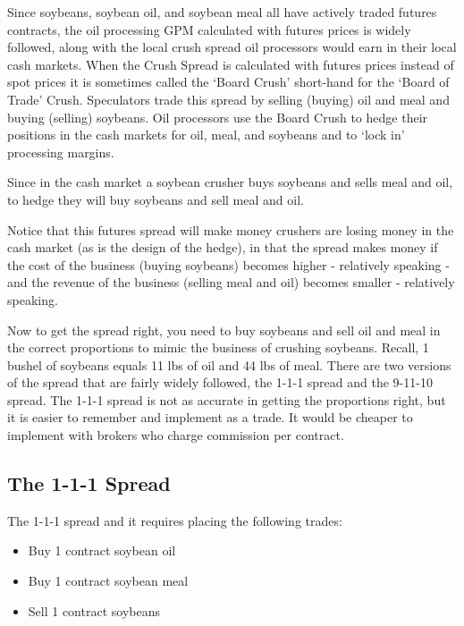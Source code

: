 \documentclass[
]{book}
\providecommand{\tightlist}{%
  \setlength{\itemsep}{0pt}\setlength{\parskip}{0pt}}
\begin{document}
Since soybeans, soybean oil, and soybean meal all have actively traded futures contracts, the oil processing GPM calculated with futures prices is widely followed, along with the local crush spread oil processors would earn in their local cash markets. When the Crush Spread is calculated with futures prices instead of spot prices it is sometimes called the `Board Crush' short-hand for the `Board of Trade' Crush. Speculators trade this spread by selling (buying) oil and meal and buying (selling) soybeans. Oil processors use the Board Crush to hedge their positions in the cash markets for oil, meal, and soybeans and to `lock in' processing margins.

Since in the cash market a soybean crusher buys soybeans and sells meal and oil, to hedge they will buy soybeans and sell meal and oil.

Notice that this futures spread will make money crushers are losing money in the cash market (as is the design of the hedge), in that the spread makes money if the cost of the business (buying soybeans) becomes higher - relatively speaking - and the revenue of the business (selling meal and oil) becomes smaller - relatively speaking.

Now to get the spread right, you need to buy soybeans and sell oil and meal in the correct proportions to mimic the business of crushing soybeans. Recall, 1 bushel of soybeans equals 11 lbs of oil and 44 lbs of meal. There are two versions of the spread that are fairly widely followed, the 1-1-1 spread and the 9-11-10 spread. The 1-1-1 spread is not as accurate in getting the proportions right, but it is easier to remember and implement as a trade. It would be cheaper to implement with brokers who charge commission per contract.

\hypertarget{the-1-1-1-spread}{%
\subsection{The 1-1-1 Spread}\label{the-1-1-1-spread}}

The 1-1-1 spread and it requires placing the following trades:

\begin{itemize}
\tightlist
\item
  Buy 1 contract soybean oil
\item
  Buy 1 contract soybean meal
\item
  Sell 1 contract soybeans
\end{itemize}
\end{document}
